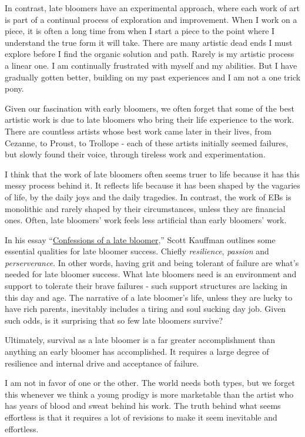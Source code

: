 \documentclass[
]{book}
\begin{document}
In contrast, late bloomers have an experimental approach, where each work of art is part of a continual process of exploration and improvement. When I work on a piece, it is often a long time from when I start a piece to the point where I understand the true form it will take. There are many artistic dead ends I must explore before I find the organic solution and path. Rarely is my artistic process a linear one. I am continually frustrated with myself and my abilities. But I have gradually gotten better, building on my past experiences and I am not a one trick pony.

Given our fascination with early bloomers, we often forget that some of the best artistic work is due to late bloomers who bring their life experience to the work. There are countless artists whose best work came later in their lives, from Cezanne, to Proust, to Trollope - each of these artists initially seemed failures, but slowly found their voice, through tireless work and experimentation.

I think that the work of late bloomers often seems truer to life because it has this messy process behind it. It reflects life because it has been shaped by the vagaries of life, by the daily joys and the daily tragedies. In contrast, the work of EBs is monolithic and rarely shaped by their circumstances, unless they are financial ones. Often, late bloomers' work feels less artificial than early bloomers' work.

In his essay ``\href{https://www.psychologytoday.com/us/articles/200811/confessions-late-bloomer}{Confessions of a late bloomer},'' Scott Kauffman outlines some essential qualities for late bloomer success. Chiefly \emph{resilience}, \emph{passion} and \emph{perserverance}. In other words, having grit and being tolerant of failure are what's needed for late bloomer success. What late bloomers need is an environment and support to tolerate their brave failures - such support structures are lacking in this day and age. The narrative of a late bloomer's life, unless they are lucky to have rich parents, inevitably includes a tiring and soul sucking day job. Given such odds, is it surprising that so few late bloomers survive?

Ultimately, survival as a late bloomer is a far greater accomplishment than anything an early bloomer has accomplished. It requires a large degree of resilience and internal drive and acceptance of failure.

I am not in favor of one or the other. The world needs both types, but we forget this whenever we think a young prodigy is more marketable than the artist who has years of blood and sweat behind his work. The truth behind what seems effortless is that it requires a lot of revisions to make it seem inevitable and effortless.
\end{document}
